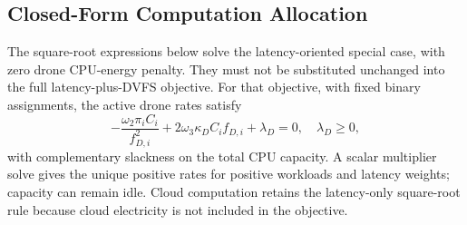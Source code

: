 \IfFileExists{IEEEtran.cls}{\documentclass[conference]{IEEEtran}}{\documentclass[10pt,twocolumn]{article}}
\begin{document}
\subsection{Closed-Form Computation Allocation}
The square-root expressions below solve the latency-oriented special case, with zero drone CPU-energy penalty. They must not be substituted unchanged into the full latency-plus-DVFS objective. For that objective, with fixed binary assignments, the active drone rates satisfy
\begin{equation}
 -\frac{\omega_2\pi_iC_i}{f_{D,i}^2}
 +2\omega_3\kappa_D C_i f_{D,i}+\lambda_D=0,
 \quad\lambda_D\geq0,
 \label{eq:dvfs_kkt}
\end{equation}
with complementary slackness on the total CPU capacity. A scalar multiplier solve gives the unique positive rates for positive workloads and latency weights; capacity can remain idle. Cloud computation retains the latency-only square-root rule because cloud electricity is not included in the objective.
\end{document}
